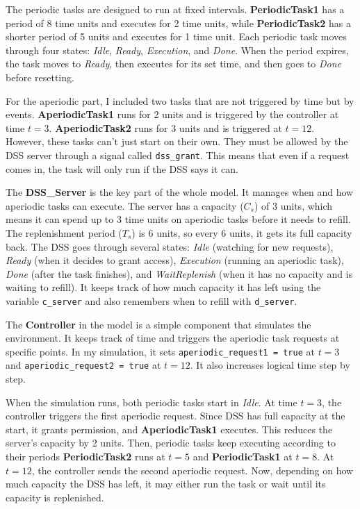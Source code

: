 \documentclass[conference]{IEEEtran}
\begin{document}
The periodic tasks are designed to run at fixed intervals. \textbf{PeriodicTask1} has a period of 8 time units and executes for 2 time units, while \textbf{PeriodicTask2} has a shorter period of 5 units and executes for 1 time unit. Each periodic task moves through four states: \textit{Idle}, \textit{Ready}, \textit{Execution}, and \textit{Done}. When the period expires, the task moves to \textit{Ready}, then executes for its set time, and then goes to \textit{Done} before resetting.


For the aperiodic part, I included two tasks that are not triggered by time but by events. \textbf{AperiodicTask1} runs for 2 units and is triggered by the controller at time $t = 3$. \textbf{AperiodicTask2} runs for 3 units and is triggered at $t = 12$. However, these tasks can’t just start on their own. They must be allowed by the DSS server through a signal called \texttt{dss\_grant}. This means that even if a request comes in, the task will only run if the DSS says it can.

The \textbf{DSS\_Server} is the key part of the whole model. It manages when and how aperiodic tasks can execute. The server has a capacity ($C_s$) of 3 units, which means it can spend up to 3 time units on aperiodic tasks before it needs to refill. The replenishment period ($T_s$) is 6 units, so every 6 units, it gets its full capacity back. The DSS goes through several states: \textit{Idle} (watching for new requests), \textit{Ready} (when it decides to grant access), \textit{Execution} (running an aperiodic task), \textit{Done} (after the task finishes), and \textit{WaitReplenish} (when it has no capacity and is waiting to refill). It keeps track of how much capacity it has left using the variable \texttt{c\_server} and also remembers when to refill with \texttt{d\_server}.

The \textbf{Controller} in the model is a simple component that simulates the environment. It keeps track of time and triggers the aperiodic task requests at specific points. In my simulation, it sets \texttt{aperiodic\_request1 = true} at $t = 3$ and \texttt{aperiodic\_request2 = true} at $t = 12$. It also increases logical time step by step.

When the simulation runs, both periodic tasks start in \textit{Idle}. At time $t = 3$, the controller triggers the first aperiodic request. Since DSS has full capacity at the start, it grants permission, and \textbf{AperiodicTask1} executes. This reduces the server's capacity by 2 units. Then, periodic tasks keep executing according to their periods \textbf{PeriodicTask2} runs at $t = 5$ and \textbf{PeriodicTask1} at $t = 8$. At $t = 12$, the controller sends the second aperiodic request. Now, depending on how much capacity the DSS has left, it may either run the task or wait until its capacity is replenished.
\end{document}
